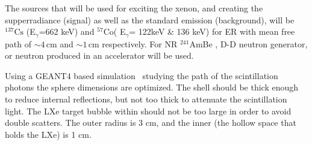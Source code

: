 The sources that will be used for exciting the xenon, and creating the supperradiance (signal) as well as the standard emission (background), will be $^{137} \mathrm{Cs}$ 
(E$_\gamma$=662 keV) and $^{57} \mathrm{Co}$( E$_\gamma$= 122keV \& 136 keV) for ER with mean free path of $\sim4$\,cm and $\sim1$\,cm respectively. For NR $^{241}$AmBe , D-D neutron generator, or neutron produced in an accelerator will be used. 

Using a GEANT4 based simulation~\cite{AGOSTINELLI2003250} studying the path of the scintillation photons the sphere dimensions are optimized. The shell should be thick enough to reduce internal reflections, but not 
too thick to attenuate the scintillation light. The LXe target bubble within should not be too large in order to avoid double scatters. The outer radius  is 3 cm, and the inner (the hollow space that holds the LXe) is 1 cm. 
